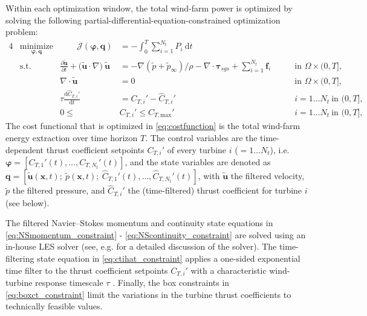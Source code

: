 \documentclass[wes, manuscript]{copernicus}
\newcommand{\bs}[1]{\boldsymbol{#1}}
\newcommand{\dt}{\text{d}t}
\newcommand{\ddt}[1]{\frac{\text{d} #1}{\text{d} t}}
\newcommand{\Tint}{\int_{0}^{T}}
\newcommand{\utilde}{\widetilde{\bs{u}}}
\newcommand{\ptilde}{\widetilde{p}}
\newcommand{\ctihat}{\widehat{C}_{T,i}'}
\newcommand{\cti}{C_{T,i}'}
\newcommand{\J}{\mathscr{J}}
\begin{document}
Within each optimization window, the total wind-farm power is optimized by solving the following partial-differential-equation-constrained optimization problem: 
\begin{alignat}{4}
& \underset{\bs{\varphi}, \bs{q}}{\text{minimize}}  & \qquad  \J(\bs{\varphi}, \bs{q}) &= - \Tint \sum_{i=1}^{N_t} P_i ~\dt  & \label{eq:costfunction}\\
& \text{s.t.}                      			&         \frac{\partial \utilde}{\partial t} + \big(\utilde \cdot \nabla \big)~ \utilde &= - \nabla (\ptilde + \ptilde_\infty) / \rho - \nabla \cdot \boldsymbol{\tau}_{sgs} + \sum_{i=1}^{N_t} \bs{f}_i \qquad  & \text{in } \Omega \times (0,T], \label{eq:NSmomentum_constraint} \\
&                                                   &        \nabla \cdot \utilde&=0 									        & \text{in } \Omega \times (0,T], \label{eq:NScontinuity_constraint}\\
&                                                   &        \tau \ddt{\ctihat}&=\cti - \ctihat 								& i=1\dots N_t~\text{in } (0,T],  \label{eq:ctihat_constraint}\\
&                                                   &       0 \leq~ &\cti \leq C_{T,\text{max}}'				& i=1\dots N_t~\text{in } (0,T],  \label{eq:boxct_constraint}
\end{alignat}
The cost functional that is optimized in \eqref{eq:costfunction} is the total wind-farm energy extraction over time horizon $T$. The control variables are the time-dependent thrust coefficient setpoints $C_{T,i}'$ of every turbine $i$ ($=1 \dots N_t$), i.e. $\bs{\varphi} = [C_{T,1}'(t), \dots, C_{T,N_t}'(t) ]$, and the state variables are denoted as  $\bs{q}=[\utilde(\bs{x},t);~ \ptilde(\bs{x},t);~ \widehat{C}_{T,1}'(t), \dots, \widehat{C}_{T,N_t}'(t)]$, with $\utilde$ the filtered velocity, $\ptilde$ the filtered pressure, and $\widehat{C}_{T,i}'$ the (time-filtered) thrust coefficient for turbine $i$ (see below). 

The filtered Navier--Stokes momentum and continuity state equations in \eqref{eq:NSmomentum_constraint} - \eqref{eq:NScontinuity_constraint} are solved using an in-house LES solver (see, e.g. \citealp{calaf2010large, meyers2010large, goit2016optimal} for a detailed discussion of the solver). The time-filtering state equation in \eqref{eq:ctihat_constraint} applies a one-sided exponential time filter to the thrust coefficient setpoints $C_{T,i}'$ with a characteristic wind-turbine response timescale $\tau$ \citep{munters2016effect}. Finally, the box constraints in \eqref{eq:boxct_constraint} limit the variations in the turbine thrust coefficients to technically feasible values. 
\end{document}
